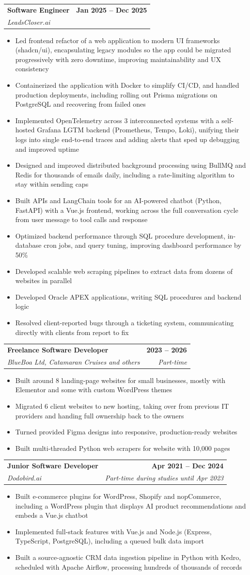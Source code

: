 \documentclass[a4paper,11pt]{article}
\makeatletter
\newcommand{\resumeItem}[1]{
  \item\justifying\small{
    {#1 \vspace{-2pt}}
  }
}
\newcommand{\resumeSubheading}[4]{
  \vspace{-2pt}\item
    \begin{tabular*}{1.0\textwidth}[t]{l@{\extracolsep{\fill}}r}
      \textbf{#1} & \textbf{\small #2} \\
      \textit{\small#3} & \textit{\small #4} \\
    \end{tabular*}\vspace{-7pt}
}
\newcommand{\resumeItemListStart}{\begin{itemize}[itemsep=2pt, topsep=3pt, parsep=0pt]}
\newcommand{\resumeItemListEnd}{\end{itemize}\vspace{4pt}}
\makeatother
\begin{document}
    \resumeSubheading
      {Software Engineer}{Jan 2025 -- Dec 2025}
      {LeadsCloser.ai}{}
      \resumeItemListStart
        \resumeItem{Led frontend refactor of a web application to modern UI frameworks (shadcn/ui), encapsulating legacy modules so the app could be migrated progressively with zero downtime, improving maintainability and UX consistency}
        \resumeItem{Containerized the application with Docker to simplify CI/CD, and handled production deployments, including rolling out Prisma migrations on PostgreSQL and recovering from failed ones}
        \resumeItem{Implemented OpenTelemetry across 3 interconnected systems with a self-hosted Grafana LGTM backend (Prometheus, Tempo, Loki), unifying their logs into single end-to-end traces and adding alerts that sped up debugging and improved uptime}
        \resumeItem{Designed and improved distributed background processing using BullMQ and Redis for thousands of emails daily, including a rate-limiting algorithm to stay within sending caps}
        \resumeItem{Built APIs and LangChain tools for an AI-powered chatbot (Python, FastAPI) with a Vue.js frontend, working across the full conversation cycle from user message to tool calls and response}
        \resumeItem{Optimized backend performance through SQL procedure development, in-database cron jobs, and query tuning, improving dashboard performance by 50\%}
        \resumeItem{Developed scalable web scraping pipelines to extract data from dozens of websites in parallel}
        \resumeItem{Developed Oracle APEX applications, writing SQL procedures and backend logic}
        \resumeItem{Resolved client-reported bugs through a ticketing system, communicating directly with clients from report to fix}
      \resumeItemListEnd

    \resumeSubheading
      {Freelance Software Developer}{2023 -- 2026}
      {BlueBoa Ltd, Catamaran Cruises and others}{Part-time}
      \resumeItemListStart
        \resumeItem{Built around 8 landing-page websites for small businesses, mostly with Elementor and some with custom WordPress themes}
        \resumeItem{Migrated 6 client websites to new hosting, taking over from previous IT providers and handing full ownership back to the owners}
        \resumeItem{Turned provided Figma designs into responsive, production-ready websites}
        \resumeItem{Built multi-threaded Python web scrapers for website with 10,000 pages}
      \resumeItemListEnd

    \resumeSubheading
      {Junior Software Developer}{Apr 2021 -- Dec 2024}
      {Dodobird.ai}{Part-time during studies until Apr 2023}
      \resumeItemListStart
        \resumeItem{Built e-commerce plugins for WordPress, Shopify and nopCommerce, including a WordPress plugin that displays AI product recommendations and embeds a Vue.js chatbot}
        \resumeItem{Implemented full-stack features with Vue.js and Node.js (Express, TypeScript, PostgreSQL), including a queued bulk data import}
        \resumeItem{Built a source-agnostic CRM data ingestion pipeline in Python with Kedro, scheduled with Apache Airflow, processing hundreds of thousands of records}
      \resumeItemListEnd
\end{document}
